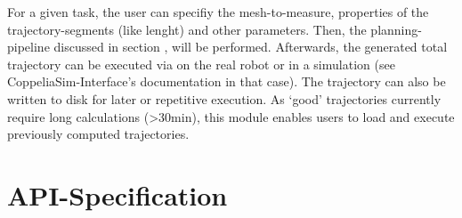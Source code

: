 \documentclass[letterpaper,10pt,english]{sphinxmanual}
\begin{document}
For a given task, the user can specifiy the mesh-to-measure, properties of the trajectory-segments (like lenght) and other parameters.
Then, the planning-pipeline discussed in section {\hyperref[\detokenize{view_planning_detailed:view-planning-detailed}]{}}, will be performed. Afterwards, the generated total trajectory can be executed via
 on the real robot or in a simulation (see CoppeliaSim-Interface’s documentation in that case). The trajectory can also be
written to disk for later or repetitive execution. As ‘good’ trajectories currently require long calculations (\textgreater{}30min),
this module enables users to load and execute previously computed trajectories.


\section{API-Specification}
\label{\detokenize{module_trajectory_manager:api-specification}}\label{\detokenize{module_trajectory_manager:module-agiprobot_measurement.trajectory_manager}}
\end{document}
